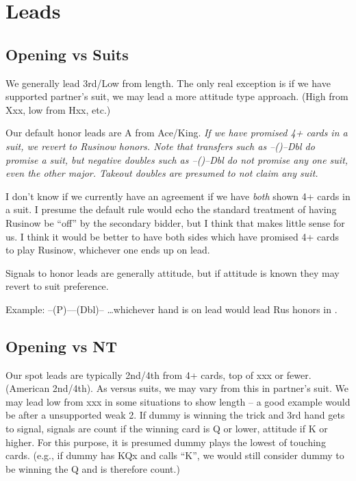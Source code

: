 \documentclass[tom-ari]{subfiles}
\begin{document}
\chapter{Leads}

\section{Opening vs Suits}

We generally lead 3rd/Low from length.  The only real exception is if we have supported partner's suit, we may lead a more attitude type approach. (High from Xxx, low from Hxx, etc.)

Our default honor leads are A from Ace/King.  \textit{If we have promised 4+ cards in a suit, we revert to Rusinow honors. Note that transfers such as --()--Dbl do promise a suit, but negative doubles such as --()--Dbl do not promise any one suit, even the other major.  Takeout doubles are presumed to not claim any suit.}

 I don't know if we currently have an agreement if we have \textit{both} shown 4+ cards in a suit. I presume the default rule would echo the standard treatment of having Rusinow be ``off'' by the secondary bidder, but I think that makes little sense for us.  I think it would be better to have both sides which have promised 4+ cards to play Rusinow, whichever one ends up on lead.

Signals to honor leads are generally attitude, but if attitude is known they may revert to suit preference.

Example: --(P)----(Dbl)-- \ldots whichever hand is on lead would lead Rus honors in \hhh. 

\section{Opening vs NT}

Our spot leads are typically 2nd/4th from 4+ cards, top of xxx or fewer. (American 2nd/4th).  As versus suits, we may vary from this in partner's suit. We may lead low from xxx in some situations to show length -- a good example would be after a unsupported weak 2. If dummy is winning the trick and 3rd hand gets to signal, signals are count if the winning card is Q or lower, attitude if K or higher. For this purpose, it is presumed dummy plays the lowest of touching cards.  (e.g., if dummy has KQx and calls ``K'', we would still consider dummy to be winning the Q and is therefore count.)
\end{document}
